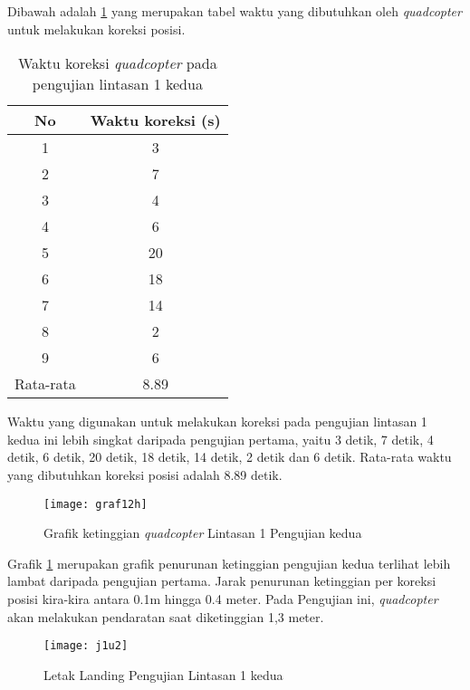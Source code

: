 Dibawah adalah \cref{tab:uji12} yang merupakan tabel waktu yang dibutuhkan oleh \textit{quadcopter} untuk melakukan koreksi posisi.

\begin{table}[H]
	\caption{Waktu koreksi \textit{quadcopter} pada pengujian lintasan 1 kedua}
	\label{tab:uji12}
	\centering
	\begin{tabular}{@{}|c|c|@{}}
		\hline
		No        & Waktu koreksi (s) \\ \hline
		1         & 3                 \\ \hline
		2         & 7                 \\ \hline
		3         & 4                 \\ \hline
		4         & 6                 \\ \hline
		5         & 20                \\ \hline
		6         & 18                \\ \hline
		7         & 14                \\ \hline
		8         & 2                 \\ \hline
		9         & 6                 \\ \hline
		Rata-rata & 8.89              \\ \hline
	\end{tabular}
\end{table}

Waktu yang digunakan untuk melakukan koreksi pada pengujian lintasan 1 kedua ini lebih singkat daripada pengujian pertama, yaitu 3 detik, 7 detik, 4 detik, 6 detik, 20 detik, 18 detik, 14 detik, 2 detik dan 6 detik. Rata-rata waktu yang dibutuhkan koreksi posisi adalah 8.89 detik.

\begin{figure}[H]
	\centering
	\texttt{[image: graf12h]}
	\caption{Grafik ketinggian \textit{quadcopter} Lintasan 1 Pengujian kedua}
	\label{fig:graf12h}
\end{figure}

Grafik \cref{fig:graf12h} merupakan grafik penurunan ketinggian pengujian kedua terlihat lebih lambat daripada pengujian pertama. Jarak penurunan ketinggian per koreksi posisi kira-kira antara 0.1m hingga 0.4 meter.
Pada Pengujian ini, \textit{quadcopter} akan melakukan pendaratan saat diketinggian 1,3 meter.\\

\begin{figure}[H]
	\centering
	\texttt{[image: j1u2]}
	\caption{Letak Landing Pengujian Lintasan 1 kedua}
	\label{fig:j1u2}
\end{figure}

